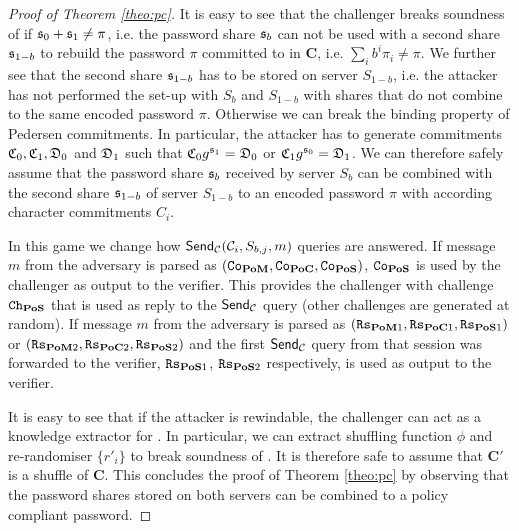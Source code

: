 \begin{proof}[Proof of Theorem \ref{theo:pc}]
It is easy to see that the challenger breaks soundness of \PoC if $\mathfrak{s}_0+\mathfrak{s}_1\not=\pi$, i.e. the password share $\mathfrak{s}_b$ can not be used with a second share $\mathfrak{s}_{1-b}$ to rebuild the password $\pi$ committed to in $\bm C$, i.e. $\sum_i b^i\pi_i\not=\pi$.
We further see that the second share $\mathfrak{s}_{1-b}$ has to be stored on server $S_{1-b}$, i.e. the attacker has not performed the set-up with $S_b$ and $S_{1-b}$ with shares that do not combine to the same encoded password $\pi$.
Otherwise we can break the binding property of Pedersen commitments.
In particular, the attacker has to generate commitments $\mathfrak{C}_0, \mathfrak{C}_1, \mathfrak{D}_0$ and $\mathfrak{D}_{1}$ such that $\mathfrak{C}_0g^{\mathfrak{s}_1}=\mathfrak{D}_0$ or $\mathfrak{C}_1g^{\mathfrak{s}_0}=\mathfrak{D}_1$.
We can therefore safely assume that the password share $\mathfrak{s}_b$ received by server $S_b$ can be combined with the second share $\mathfrak{s}_{1-b}$ of server $S_{1-b}$ to an encoded password $\pi$ with according character commitments $C_i$.


In this game we change how $\mathsf{Send}_\mathcal{C}(\mathcal{C}_i, S_{b,j}, m)$ queries are answered.
If message $m$ from the adversary is parsed as $(\mathtt{Co}_\mathsf{\bf PoM},\mathtt{Co}_\mathsf{\bf PoC},\mathtt{Co}_\mathsf{\bf PoS})$, $\mathtt{Co}_\mathsf{\bf PoS}$ is used by the challenger as output to the \PoS verifier.
This provides the challenger with challenge $\mathtt{Ch}_\mathsf{\bf PoS}$ that is used as reply to the $\mathsf{Send}_\mathcal{C}$ query (other challenges are generated at random).
If message $m$ from the adversary is parsed as $(\mathtt{Rs}_{\mathsf{\bf PoM}1},\mathtt{Rs}_{\mathsf{\bf PoC}1},\mathtt{Rs}_{\mathsf{\bf PoS}1})$ or $(\mathtt{Rs}_{\mathsf{\bf PoM}2},\mathtt{Rs}_{\mathsf{\bf PoC}2},\mathtt{Rs}_{\mathsf{\bf PoS}2})$ and the first $\mathsf{Send}_\mathcal{C}$ query from that session was forwarded to the verifier, $\mathtt{Rs}_{\mathsf{\bf PoS}1}$, $\mathtt{Rs}_{\mathsf{\bf PoS}2}$ respectively, is used as output to the \PoS verifier.

It is easy to see that if the attacker is rewindable, the challenger can act as a knowledge extractor for \PoS.
In particular, we can extract shuffling function $\phi$ and re-randomiser $\{r'_i\}$ to break soundness of \PoS.
It is therefore safe to assume that $\bm C'$ is a shuffle of $\bm C$.
This concludes the proof of Theorem \ref{theo:pc} by observing that the password shares stored on both servers can be combined to a policy compliant password.
\end{proof}



